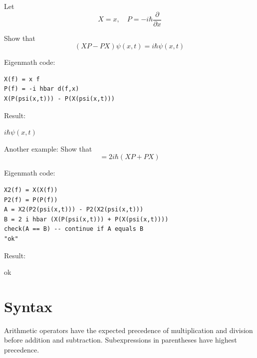 \documentclass[12pt]{article}
\begin{document}
Let
\begin{equation*}
X=x,\quad P=-i\hbar\frac{\partial}{\partial x}
\end{equation*}

Show that
\begin{equation*}
(XP-PX)\psi(x,t)=i\hbar\psi(x,t)
\end{equation*}

Eigenmath code:
{\color{blue}
\begin{verbatim}
X(f) = x f
P(f) = -i hbar d(f,x)
X(P(psi(x,t))) - P(X(psi(x,t)))
\end{verbatim}}

Result:

\bigskip
$i\hbar\psi(x,t)$

\bigskip
Another example: Show that
\begin{equation*}
[X^2,P^2]=2i\hbar(XP+PX)
\end{equation*}

Eigenmath code:
{\color{blue}
\begin{verbatim}
X2(f) = X(X(f))
P2(f) = P(P(f))
A = X2(P2(psi(x,t))) - P2(X2(psi(x,t)))
B = 2 i hbar (X(P(psi(x,t))) + P(X(psi(x,t))))
check(A == B) -- continue if A equals B
"ok"
\end{verbatim}}

Result:

\bigskip
ok

\newpage

\section{Syntax}

Arithmetic operators have the expected precedence of
multiplication and division before addition and subtraction.
Subexpressions in parentheses have highest precedence.
\end{document}
